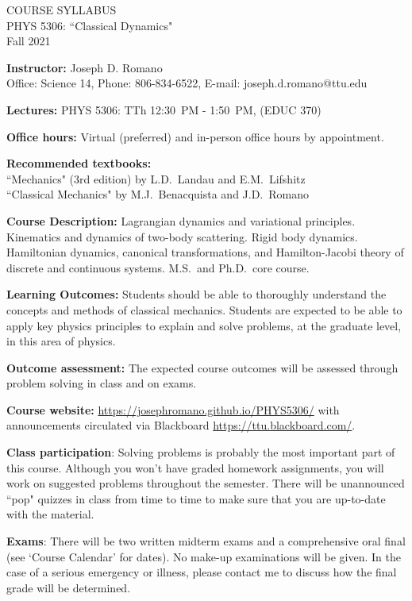 \documentclass[11pt]{NSF}
\begin{document}
\begin{center}
COURSE SYLLABUS\\
PHYS 5306: ``Classical Dynamics"\\
Fall 2021\\
\end{center}

{\bf Instructor:}
Joseph D. Romano\\
Office: Science 14, Phone: 806-834-6522, E-mail: joseph.d.romano@ttu.edu

{\bf Lectures:}
PHYS 5306: TTh 12:30~PM - 1:50~PM, (EDUC 370)

{\bf Office hours:}
Virtual (preferred) and in-person office hours by appointment.

{\bf Recommended textbooks:}\\
``Mechanics" (3rd edition) by L.D.~Landau and E.M.~Lifshitz\\
``Classical Mechanics" by M.J.~Benacquista and J.D.~Romano

{\bf Course Description:}
Lagrangian dynamics and variational principles. Kinematics and dynamics of
two-body scattering. Rigid body dynamics. Hamiltonian dynamics, canonical
transformations, and Hamilton-Jacobi theory of discrete and continuous systems.
M.S.\ and Ph.D.\ core course.  

{\bf Learning Outcomes:}
Students should be able to thoroughly understand the concepts and
methods of classical mechanics. Students are expected to be
able to apply key physics principles to explain and solve problems,
at the graduate level, in this area of physics.

{\bf Outcome assessment:} 
The expected course outcomes will be assessed through problem solving 
in class and on exams.

{\bf Course website:}
\url{https://josephromano.github.io/PHYS5306/} with announcements
circulated via Blackboard \url{https://ttu.blackboard.com/}.

{\bf Class participation}:
Solving problems is probably the most important part of 
this course.
Although you won't have graded homework assignments, you will 
work on suggested problems throughout the semester.
There will be unannounced ``pop" quizzes in class from time to time 
to make sure that you are up-to-date with the material.

{\bf Exams}:
There will be two written midterm exams and a comprehensive 
oral final (see `Course Calendar' for dates).
No make-up examinations will be given. In the case of a
serious emergency or illness, please contact me to discuss how 
the final grade will be determined.
\end{document}
